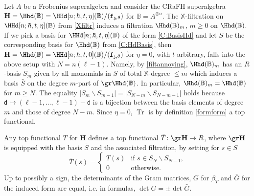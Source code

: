 \documentclass[a4paper,11pt]{amsart}
\newcommand{\Tr}{\op{Tr}}
\numberwithin{equation}{subsection}
\theoremstyle{definition}
\theoremstyle{theorem}
\theoremstyle{remark}
\newcommand\charge{{\mathfrak{z}}}
\newcommand\fct{\mathtt{f}_{\charge,\theta}}
\newcommand\bd{\mathsf{d}}
\newcommand\op{\operatorname}
\newcommand\X{\mathbb{X}}
\newcommand{\Bo}{\mathbb{B}}
\begin{document}
 \begin{Example}\label{extop}
 Let $A$ be a Frobenius superalgebra and consider the  CRaFH
 superalgebra $\mathbf{H}=\Hhd(\Bo)=\HHd[n;\hbar, t, \eta](\Bo)/(\fct)$
 for $\Bo=A^{\otimes n}$.  The $\X$-filtration on $\HHd[n;\hbar, t,
 \eta](\Bo)$ from \autoref{Xfiltr} induces a filtration $\Hhd(\Bo)_m$, $m\geq0$ on $\Hhd(\Bo)$.
If we pick a basis for $\HHd[n;\hbar, t, \eta](\Bo)$ of the form \autoref{C:BasisHd}  and let $S$ be the corresponding basis for $\Hhd(\Bo)$ from \autoref{C:HdBasis}, then $\mathbf{H}=\Hhd(\Bo)=\HHd[n;\hbar, t, 0](\Bo)/(\fct)$ for $\eta=0$, with $t$ arbitrary, falls into the above setup with $N=n(\ell-1)$. Namely, by  \autoref{filtannoying}, $\Hhd(\Bo)_m$ has an $R$-basis $S_m$ given by all monomials in $S$ of total $\X$-degree $\leq m$ which induces a basis $\bar S$ on the degree $m$-part of $\gr\Hhd(\Bo)$. In particular, $\Hhd(\Bo)_m=\Hhd(\Bo)$ for $m\geq N$.  The equality $|S_m\smallsetminus S_{m-1}|=|S_{N-m}\smallsetminus S_{N-m-1}|$ holds because $\bd\mapsto(\ell-1,\dots,\ell-1)-\bd$ is a bijection between the basis elements of degree $m$ and those of degree $N-m$. Since $\eta=0$, $\Tr$ is by definition \autoref{formform} a top functional.
 \end{Example}

\begin{Lemma}\label{L:antitri}
  Any  top functional $T$ for $\mathbf{H}$ defines a top functional $\bar T\colon \gr\mathbf{H}\rightarrow R$,  where $\gr \mathbf{H}$ is equipped with the basis $\bar S$ and the associated filtration, by setting for $s\in S$
  \[
    \bar T(\bar s)=
      \begin{cases}
       T(s)&\text{if $s\in S_N\smallsetminus S_{N-1}$,}\\
     0&\text{otherwise.}
            \end{cases}
  \]
Up to possibly a sign,  the determinants of the Gram matrices,  $G$ for $\beta_T$  and $\bar G$ for  the induced form  are equal, i.e. in formulas,
$\det G=\pm\det\bar G$.
\end{Lemma}
\end{document}
